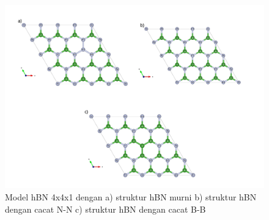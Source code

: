 \begin{figure}
    \centering
    \includegraphics[width=0.8\linewidth]{gambar_hasil/structures_all.png}
    \caption{Model hBN 4x4x1 dengan a) struktur hBN murni b) struktur hBN dengan cacat N-N c) struktur hBN dengan cacat B-B}
    \label{Struktur hBN 4x4x1}
\end{figure}

